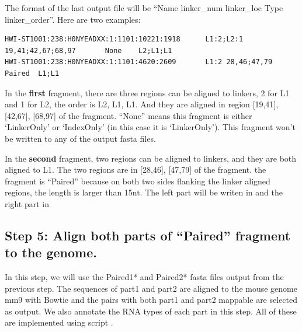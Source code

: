 \documentclass[letterpaper,10pt,english]{sphinxmanual}
\begin{document}
The format of the last output file  will be ``Name \textbar{} linker\_num \textbar{} linker\_loc \textbar{} Type \textbar{} linker\_order''. Here are two examples:

\begin{Verbatim}[commandchars=\\\{\}]
HWI-ST1001:238:H0NYEADXX:1:1101:10221:1918      L1:2;L2:1  19,41;42,67;68,97       None    L2;L1;L1
HWI-ST1001:238:H0NYEADXX:1:1101:4620:2609       L1:2 28,46;47,79     Paired  L1;L1
\end{Verbatim}

In the \textbf{first} fragment, there are three regions can be aligned to linkers, 2 for L1 and 1 for L2, the order is L2, L1, L1. And they are aligned in region {[}19,41{]}, {[}42,67{]}, {[}68,97{]} of the fragment. ``None'' means this fragment is either `LinkerOnly' or `IndexOnly' (in this case it is `LinkerOnly'). This fragment won't be written to any of the output fasta files.

In the \textbf{second} fragment, two regions can be aligned to linkers, and they are both aligned to L1. The two regions are in {[}28,46{]}, {[}47,79{]} of the fragment. the fragment is ``Paired'' because on both two sides flanking the linker aligned regions, the length is larger than 15nt. The left part will be writen in  and the right part in 


\subsection{Step 5: Align both parts of ``Paired'' fragment to the genome.}
\label{Analysis_pipeline:step-5-align-both-parts-of-paired-fragment-to-the-genome}\label{Analysis_pipeline:step5}
In this step, we will use the Paired1* and Paired2* fasta files output from the previous step. The sequences of part1 and part2 are aligned to the mouse genome mm9 with Bowtie and the pairs with both part1 and part2 mappable are selected as output. We also annotate the RNA types of each part in this step.
All of these are implemented using script .
\end{document}
